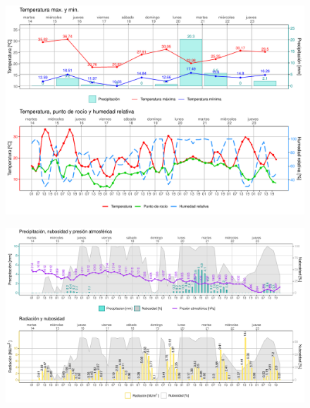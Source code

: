 \documentclass[[a4paper,landscape]{article}\usepackage[]{graphicx}\usepackage[]{color}
\makeatletter
\def\maxwidth{ %
  \ifdim\Gin@nat@width>\linewidth
    \linewidth
  \else
    \Gin@nat@width
  \fi
}
\newenvironment{knitrout}{}{} %
\makeatother
\begin{document}
\pagestyle{plain}
\begin{figure}
\begin{knitrout}
\color{fgcolor}
\includegraphics[width=\maxwidth]{figure/Figtemperatura-1} 

\end{knitrout}
\end{figure}

\begin{figure}
\begin{knitrout}
\color{fgcolor}
\includegraphics[width=\maxwidth]{figure/Figprecipitacion-1} 

\end{knitrout}
\end{figure}
\end{document}
